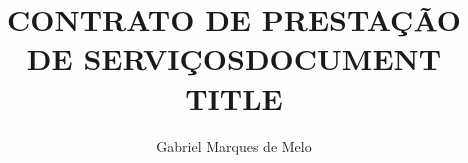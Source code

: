 




\def\titulo{CONTRATO DE PRESTAÇÃO DE SERVIÇOS}

\title{\titulo{DOCUMENT TITLE}}
\author{Gabriel Marques de Melo}


    \maketitle
    \thispagestyle{first_page}
    \pagestyle{all_pages}

